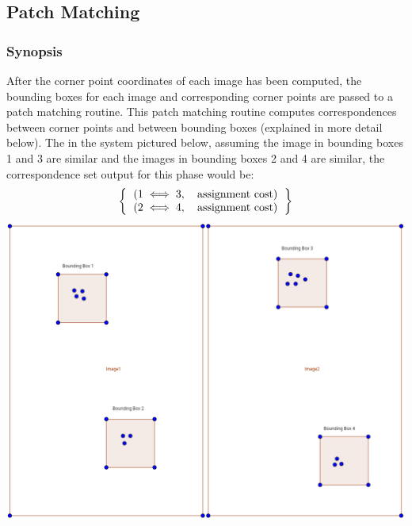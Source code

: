 \documentclass{article}
\begin{document}
\newpage
\subsection{Patch Matching}
\subsubsection{Synopsis}
After the corner point coordinates of each image has been computed, the bounding boxes for each image and corresponding corner points are passed to a patch matching routine.  This patch matching routine computes correspondences between corner points and between bounding boxes (explained in more detail below).  The in the system pictured below, assuming the image in bounding boxes 1 and 3 are similar and the images in bounding boxes 2 and 4 are similar, the correspondence set output for this phase would be:
\[
\left \{
\begin{tabular}{c}
$(1 \iff 3,\quad \text{assignment cost})$ \\
$(2 \iff 4,\quad \text{assignment cost})$
\end{tabular}
\right \}
\]
\includegraphics[width=\textwidth]{aftercorner}
\end{document}

